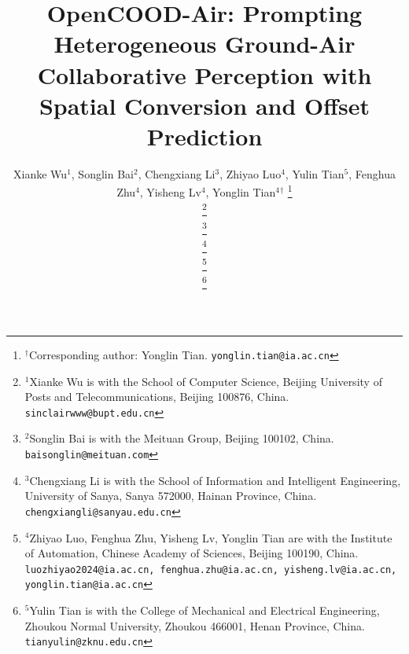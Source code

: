 \documentclass[conference]{IEEEtran}
\begin{document}
\title{OpenCOOD-Air: Prompting Heterogeneous Ground-Air Collaborative Perception with Spatial Conversion and Offset Prediction\\
}

\author{Xianke Wu$^{1}$, Songlin Bai$^{2}$, Chengxiang Li$^{3}$, Zhiyao Luo$^{4}$, Yulin Tian$^{5}$, Fenghua Zhu$^{4}$, Yisheng Lv$^{4}$, Yonglin Tian$^{4}$$^{\dagger}$%
\thanks{$^{\dagger}$Corresponding author: Yonglin Tian. {\tt\small yonglin.tian@ia.ac.cn}}%

\thanks{$^{1}$Xianke Wu is with the School of Computer Science, Beijing University
of Posts and Telecommunications, Beijing 100876, China. {\tt\small sinclairwww@bupt.edu.cn}}%

\thanks{$^{2}$Songlin Bai is with the Meituan Group, Beijing 100102, China. {\tt\small baisonglin@meituan.com}}%

\thanks{$^{3}$Chengxiang Li is with the School of Information and Intelligent Engineering, University of Sanya, Sanya 572000, Hainan Province, China. {\tt\small chengxiangli@sanyau.edu.cn}}%

\thanks{$^{4}$Zhiyao Luo, Fenghua Zhu, Yisheng Lv, Yonglin Tian are with the Institute of Automation, Chinese Academy of Sciences, Beijing 100190, China. {\tt\small luozhiyao2024@ia.ac.cn, fenghua.zhu@ia.ac.cn, yisheng.lv@ia.ac.cn, yonglin.tian@ia.ac.cn} }%

\thanks{$^{5}$Yulin Tian is with the College of Mechanical and Electrical Engineering, Zhoukou Normal University, Zhoukou 466001, Henan Province, China. {\tt\small tianyulin@zknu.edu.cn}}%


}


\end{document}
